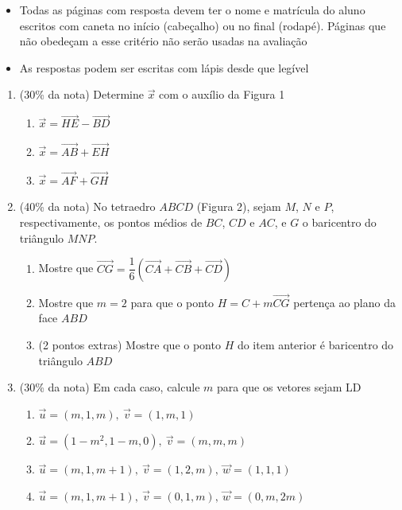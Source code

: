 \documentclass[12pt,a4paper,brazilian, fleqn]{article}
\newcommand{\ratio}[1]{(#1\% da nota)}
\renewcommand{\vec}[1]{\overrightarrow{#1}}
\begin{document}
\begin{tcolorbox}[colback=black!10, colframe=black!50, title=Observações]
    \begin{itemize}
        \item Todas as páginas com resposta devem ter o nome e matrícula do aluno
            escritos com caneta no início (cabeçalho) ou no final (rodapé). Páginas
            que não obedeçam a esse critério não serão usadas na avaliação
        \item As respostas podem ser escritas com lápis desde que legível
    \end{itemize}
\end{tcolorbox}

\begin{enumerate}
    \item \ratio{30} Determine \(\vec{x}\) com o auxílio da Figura 1
        \begin{enumerate}
            \item \(\vec{x}=\vec{HE}-\vec{BD}\)
            \item \(\vec{x}=\vec{AB}+\vec{EH}\)
            \item \(\vec{x}=\vec{AF}+\vec{GH}\)
        \end{enumerate}
    \item \ratio{40} No tetraedro \(ABCD\) (Figura 2), sejam \(M\), \(N\) e \(P\), respectivamente,
        os pontos médios de \(BC\), \(CD\) e \(AC\), e \(G\) o baricentro do triângulo \(MNP\).
        \begin{enumerate}
            \item Mostre que \(\vec{CG}=\dfrac{1}{6}(\vec{CA}+\vec{CB}+\vec{CD})\)
            \item Mostre que \(m=2\) para que o ponto \(H=C+m\vec{CG}\) pertença ao plano da face \(ABD\)
            \item (2 pontos extras) Mostre que o ponto \(H\) do item anterior é baricentro do triângulo \(ABD\)
        \end{enumerate}

    \item \ratio{30} Em cada caso, calcule \(m\) para que os vetores sejam LD
        \begin{enumerate}
            \item \(\vec{u}=(m,1,m),~\vec{v}=(1,m,1)\)
            \item \(\vec{u}=(1-m^2,1-m,0),~\vec{v}=(m,m,m)\)
            \item \(\vec{u}=(m,1,m+1),~\vec{v}=(1,2,m),~\vec{w}=(1,1,1)\)
            \item \(\vec{u}=(m,1,m+1),~\vec{v}=(0,1,m),~\vec{w}=(0,m,2m)\)
        \end{enumerate}
\end{enumerate}
\end{document}
